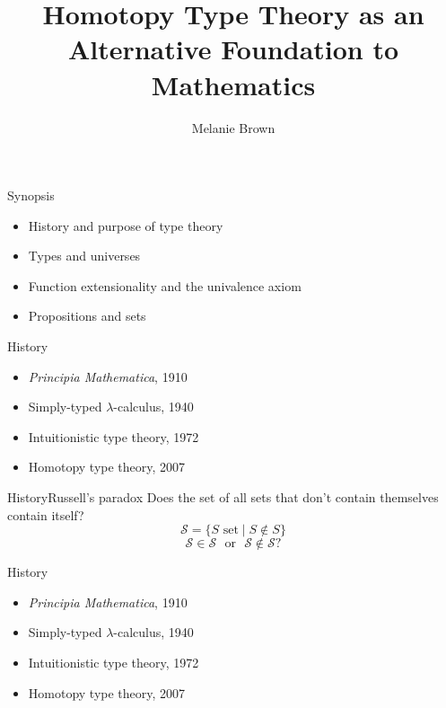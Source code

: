 \documentclass{beamer}
\title[Homotopy Type Theory]{Homotopy Type Theory as an \\ Alternative Foundation to Mathematics}
\author{Melanie Brown}
\date{}
\newcommand{\1}{\textbf{1}}
\newcommand{\0}{\mathbf{0}}
\newcommand{\2}{\textbf{2}}
\begin{document}
\let\OD\displaystyle
\let\displaystyle\textstyle
\begin{frame}{}
	\titlepage
\end{frame}
\begin{frame}{Synopsis}
\begin{itemize}
	\item<1> History and purpose of type theory
	\item<2> Types and universes
	\item<3> Function extensionality and the univalence axiom
	\item<4> Propositions and sets
\end{itemize} \end{frame}
\begin{frame}{History}
\begin{itemize}
	\item<1> \emph{Principia Mathematica}, 1910
	\item<0> Simply-typed \( \lambda \)-calculus, 1940
	\item<0> Intuitionistic type theory, 1972
	\item<0> Homotopy type theory, 2007
\end{itemize} \end{frame}
\begin{frame}{History}{Russell's paradox}
Does the set of all sets that don't contain themselves contain itself?
\[ \mathcal{S} = \{ S \text{ set} \mid S \notin S \} \]
\[ \mathcal{S} \in \mathcal{S} \text{~ or ~} \mathcal{S} \notin \mathcal{S}? \]
\end{frame}
\begin{frame}{History}
\begin{itemize}
	\item<0> \emph{Principia Mathematica}, 1910
	\item<1> Simply-typed \( \lambda \)-calculus, 1940
	\item<2> Intuitionistic type theory, 1972
	\item<3> Homotopy type theory, 2007
\end{itemize} \end{frame}
\end{document}
